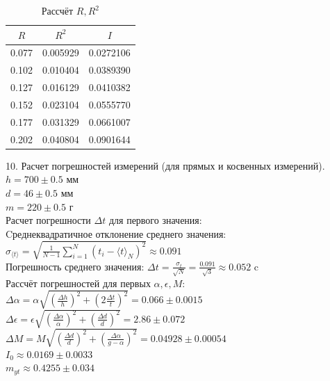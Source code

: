 \documentclass[12pt]{article}
\begin{document}
\begin{table}[h]
    \centering
    \renewcommand{\arraystretch}{1.3}
    \setlength{\tabcolsep}{8pt}
    \captionsetup{justification=centering, font=bf}
    \caption{Рассчёт $ R, R^2 $} 
    \begin{tabular}{|c|c|c|}
        \hline
        $ R $ & $ R^2 $ & $ I $ \\
        \hline
        0.077	&	0.005929	&	0.0272106 \\
        \hline
        0.102	&	0.010404	&	0.0389390 \\
        \hline
        0.127	&	0.016129	&	0.0410382 \\
        \hline
        0.152	&	0.023104	&	0.0555770 \\
        \hline
        0.177	&	0.031329	&	0.0661007 \\
        \hline
        0.202	&	0.040804	&	0.0901644 \\
        \hline

    \end{tabular}
\end{table}


\begin{flushleft}
    10. Расчет погрешностей измерений (для прямых и косвенных измерений). \\
    $ h = 700 \pm 0.5 $ мм \\
    $ d = 46 \pm 0.5 $ мм \\
    $ m = 220 \pm 0.5 $ г \\
    Расчет погрешности $ \Delta t $ для первого значения: \\ 
    Cреднеквадратичное отклонение среднего значения: $ \sigma_{\langle t \rangle} = \sqrt{\frac{1}{N - 1} \sum_{i=1}^{N} (t_i - \langle t \rangle_N)^2} \approx 0.091 $ \\
    Погрешность среднего значения: $ \Delta t = \frac{\sigma_t}{\sqrt{N}} = \frac{0.091}{\sqrt{3}} \approx 0.052 $ c \\
    Рассчёт погрешностей для первых $ \alpha, \epsilon, M $: \\
    $ \Delta \alpha = \alpha\sqrt{(\frac{\Delta h}{h})^2 + (2\frac{\Delta t}{t})^2} = 0.066 \pm 0.0015 $ \\
    $ \Delta \epsilon = \epsilon\sqrt{(\frac{\Delta \alpha}{\alpha})^2 + (\frac{\Delta d}{d})^2} = 2.86 \pm 0.072$ \\
    $ \Delta M = M\sqrt{(\frac{\Delta d}{d})^2 + (\frac{\Delta \alpha}{g - \alpha})^2} = 0.04928 \pm 0.00054 $ \\
    $ I_0 \approx 0.0169 \pm 0.0033 $ \\
    $ m_{yt} \approx 0.4255 \pm 0.034 $ \\
\end{flushleft}
\end{document}
